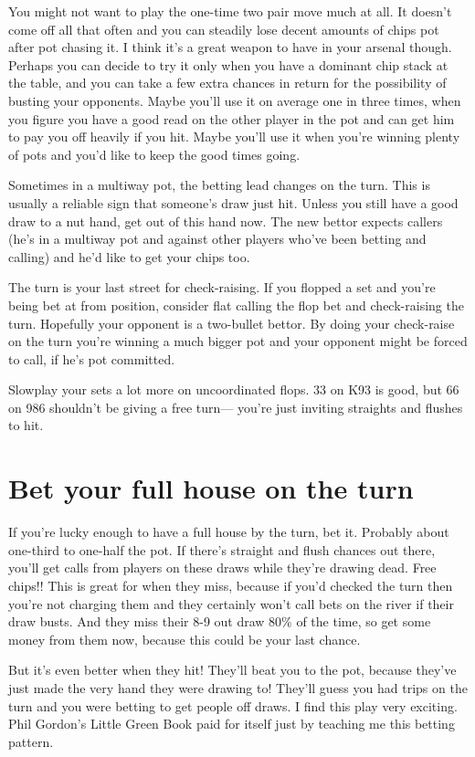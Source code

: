 You might not want to play the one-time two pair move much at all.
It doesn't come off all that often and you can steadily lose decent
amounts of chips pot after pot chasing it. I think it's
a great weapon to have in your arsenal though. Perhaps you
can decide to try it only when you have a dominant chip stack at
the table, and you can take a few extra chances in return for the
possibility of busting your opponents. Maybe you'll use it on average
one in three times, when you figure you have a good read on
the other player in the pot and can get him to pay you off heavily
if you hit. Maybe you'll use it when you're winning plenty of pots
and you'd like to keep the good times going.

Sometimes in a multiway pot, the betting lead changes on the turn.
This is usually a reliable sign that someone's draw just hit. Unless
you still have a good draw to a nut hand, get out of this hand now.
The new bettor expects callers (he's in a multiway pot and against
other players who've been betting and calling) and he'd like to
get your chips too.

The turn is your last street for check-raising. If you flopped a set
and you're being bet at from position, consider flat calling the
flop bet and check-raising the turn. Hopefully your opponent
is a two-bullet bettor. By doing your check-raise on the turn
you're winning a much bigger pot and your opponent might be
forced to call, if he's pot committed.

Slowplay your sets a lot more on uncoordinated flops. 33 on K93 is good,
but 66 on 986 shouldn't be giving a free turn--- you're just inviting
straights and flushes to hit.

\section{Bet your full house on the turn}

If you're lucky enough to have a full house by the turn, bet it.
Probably about one-third to one-half the pot. If there's straight
and flush chances out there, you'll get calls from players on
these draws while they're drawing dead. Free chips!! This is great for when
they miss, because if you'd checked the turn then you're not charging them and
they certainly won't call bets on the river if their draw busts.
And they miss their 8-9 out draw 80\% of the time, so get some money
from them now, because this could be your last chance.

But it's even better when they hit! They'll beat you to the pot, because
they've just made the very hand they were drawing to! They'll guess
you had trips on the turn and you were betting to get people off draws.
I find this play very exciting. Phil Gordon's
Little Green Book paid for itself just by teaching me this betting pattern.


